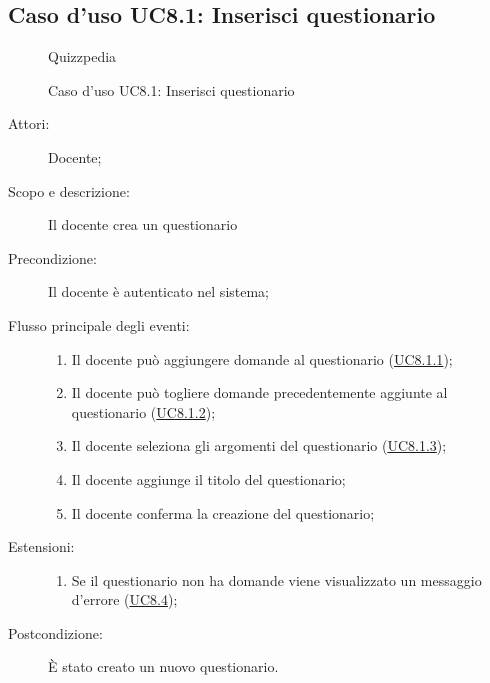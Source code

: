 \subsection{Caso d'uso UC8.1: Inserisci questionario}
        \begin{figure}[H]
            \centering
            \begin{resizedtikzpicture}{\textwidth}
		\begin{umlsystem}[x=0, fill=lightgray!20]{Quizzpedia}
		\end{umlsystem}
            \end{resizedtikzpicture}
            \caption{Caso d'uso UC8.1: Inserisci questionario}
            \label{fig:UC8.1} 
        \end{figure}
    \begin{description}
\item[Attori:] Docente;
\item[Scopo e descrizione:] Il docente crea un questionario
      \item[Precondizione:] Il docente è autenticato nel sistema;

        \item[Flusso principale degli eventi:] \begin{enumerate}
          \item Il docente può aggiungere domande al questionario (\hyperlink{UC8.1.1}{UC8.1.1});
          \item Il docente può togliere domande precedentemente aggiunte al questionario (\hyperlink{UC8.1.2}{UC8.1.2});
          \item Il docente seleziona gli argomenti del questionario (\hyperlink{UC8.1.3}{UC8.1.3});
          \item Il docente aggiunge il titolo del questionario;
          \item Il docente conferma la creazione del questionario;

      \end{enumerate}
    \item[Estensioni:]
      \begin{enumerate}
          \item Se il questionario non ha domande viene visualizzato un messaggio d'errore (\hyperlink{UC8.4}{UC8.4});

      \end{enumerate}
    \item[Postcondizione:] È stato creato un nuovo questionario.
  \end{description}
\hypertarget{UC8.1.1}{}
